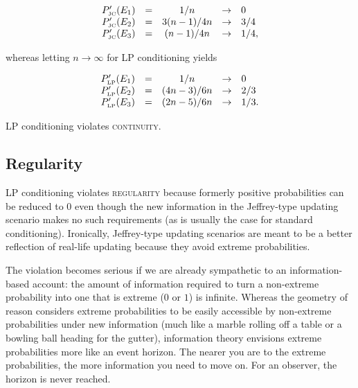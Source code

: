 \documentclass[11pt]{article}
\begin{document}
\begin{equation}
  \label{eq:sherlockcontjc}
  \begin{array}{rcccl}
  P'_{\mbox{\tiny JC}}(E_{1})&=&1/n&\rightarrow&0\\
  P'_{\mbox{\tiny JC}}(E_{2})&=&3(n-1)/4n&\rightarrow&3/4\\
  P'_{\mbox{\tiny JC}}(E_{3})&=&(n-1)/4n&\rightarrow&1/4,
\end{array}
\end{equation}

whereas letting $n\rightarrow\infty$ for LP conditioning yields

\begin{equation}
  \label{eq:sherlockcontlp}
  \begin{array}{rcccl}
  P'_{\mbox{\tiny LP}}(E_{1})&=&1/n&\rightarrow&0\\
  P'_{\mbox{\tiny LP}}(E_{2})&=&(4n-3)/6n&\rightarrow&2/3\\
  P'_{\mbox{\tiny LP}}(E_{3})&=&(2n-5)/6n&\rightarrow&1/3.
\end{array}
\end{equation}

LP conditioning violates \textsc{continuity}.

\subsection{Regularity}
\label{Regularity}

LP conditioning violates \textsc{regularity} because formerly positive
probabilities can be reduced to $0$ even though the new information in
the Jeffrey-type updating scenario makes no such requirements (as is
usually the case for standard conditioning). Ironically, Jeffrey-type
updating scenarios are meant to be a better reflection of real-life
updating because they avoid extreme probabilities. 

The violation becomes serious if we are already sympathetic to an
infor\-ma\-tion-based account: the amount of information required to turn
a non-extreme probability into one that is extreme ($0$ or $1$) is
infinite. Whereas the geometry of reason considers extreme
probabilities to be easily accessible by non-extreme probabilities
under new information (much like a marble rolling off a table or a
bowling ball heading for the gutter), information theory envisions
extreme probabilities more like an event horizon. The nearer you are
to the extreme probabilities, the more information you need to move
on. For an observer, the horizon is never reached.
\end{document}
